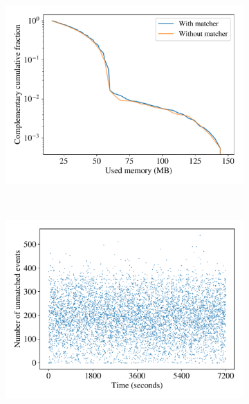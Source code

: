 \begin{figure}[t!]
\begin{subfigure}[t]{0.33\textwidth}
        \centering
        \includegraphics[width=1.0\textwidth]{figures/diffstream/memory_ccdf.pdf}
        \caption{}\label{fig:memory-ccdf}
    \end{subfigure}%
    \\
    \begin{subfigure}[t]{0.33\textwidth}
        \centering
        \includegraphics[width=1.0\textwidth]{figures/diffstream/unmatched_in_time.pdf}
        \caption{}\label{fig:unmatched-in-time}
    \end{subfigure}%
    \begin{subfigure}[t]{0.33\textwidth}
        \centering

\end{subfigure}
\end{figure}
